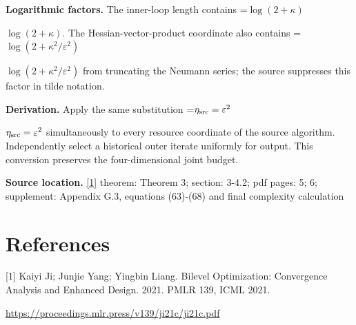 \documentclass[10pt,a4paper]{article}
\newcommand{\AtlasMath}[1]{\par\begingroup\centering\setbox0=\hbox{$\displaystyle #1$}\ifdim\wd0>1.4\linewidth\typeout{ATLAS WIDE FORMULA: \the\wd0}\fi\ifdim\wd0>\linewidth\resizebox{\linewidth}{!}{\box0}\else\box0\fi\par\endgroup}
\newcommand{\AtlasInlineMath}[1]{\begingroup\setbox0=\hbox{$#1$}\ifdim\wd0>.4\linewidth\endgroup\AtlasMath{#1}\else\endgroup$#1$\fi}
\begin{document}
\textbf{Logarithmic factors.} The inner-loop length contains \AtlasInlineMath{\log(2+\kappa)}. The Hessian-vector-product coordinate also contains \AtlasInlineMath{\log(2+\kappa^2/\varepsilon^2)} from truncating the Neumann series; the source suppresses this factor in tilde notation.

\textbf{Derivation.} Apply the same substitution \AtlasInlineMath{\eta_{\rm src}=\varepsilon^2} simultaneously to every resource coordinate of the source algorithm. Independently select a historical outer iterate uniformly for output. This conversion preserves the four-dimensional joint budget.

\textbf{Source location.} \href{https://proceedings.mlr.press/v139/ji21c/ji21c.pdf}{[1]} theorem: Theorem 3; section: 3-4.2; pdf pages: 5; 6; supplement: Appendix G.3, equations (63)-(68) and final complexity calculation

\section{References}
[1] Kaiyi Ji; Junjie Yang; Yingbin Liang. Bilevel Optimization: Convergence Analysis and Enhanced Design. 2021. PMLR 139, ICML 2021.

\url{https://proceedings.mlr.press/v139/ji21c/ji21c.pdf}
\end{document}
